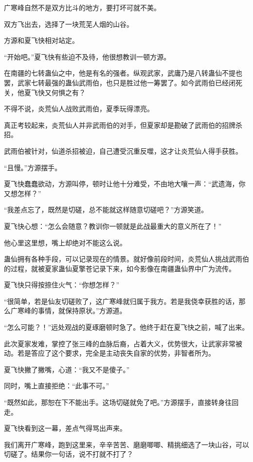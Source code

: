 \begin{this_body}
广寒峰自然不是双方比斗的地方，要打坏可就不美。

双方飞出去，选择了一块荒芜人烟的山谷。

方源和夏飞快相对站定。

“开始吧。”夏飞快有些迫不及待，他很想教训一顿方源。

在南疆的七转蛊仙之中，他是有名的强者。纵观武家，武庸乃是八转蛊仙不提也罢，武家七转最强的蛊仙武雨伯，也只是胜过他一筹罢了。如今武雨伯已经闭死关，他夏飞快又何惧之有？

不得不说，炎荒仙人战败武雨伯，夏季玩得漂亮。

真正考较起来，炎荒仙人并非武雨伯的对手，但夏家却是勘破了武雨伯的招牌杀招。

武雨伯被针对，仙道杀招被迫，自己遭受沉重反噬，这才让炎荒仙人得手获胜。

“且慢。”方源摆手。

夏飞快蠢蠢欲动，方源叫停，顿时让他十分难受，不由地大嚷一声：“武遗海，你又想怎样？”

“我差点忘了，既然是切磋，总不能就这样随意切磋吧？”方源笑道。

夏飞快心想：“怎么会随意？教训你一顿就是此战最重大的意义所在了！”

他心里这里想，嘴上却绝对不能这么说。

蛊仙拥有各种手段，可以记录现在的情景。就好像前段时间，炎荒仙人挑战武雨伯的过程，就被夏家蛊仙夏擎苍记录下来，如今影像在南疆蛊仙界中广为流传。

夏飞快只得按捺住火气：“你想怎样？”

“很简单，若是仙友切磋败了，这广寒峰就归属于我方。若是我侥幸获胜的话，那么广寒峰的事情，就保持原状。”方源道。

“怎么可能？！”远处观战的夏琢磨顿时急了。他终于赶在夏飞快之前，喊了出来。

此次夏家发难，掌控了张三峰的血脉后裔，占着大义，优势很大，让武家非常被动。若是答应了这个要求，完全是主动丧失自家的优势，非智者所为。

夏飞快撇了撇嘴，心道：“我又不是傻子。”

同时，嘴上直接拒绝：“此事不可。”

“既然如此，那恕在下不能出手。这场切磋就免了吧。”方源摆手，直接转身往回走。

夏飞快看到这一幕，差点气得骂出声来。

我们离开广寒峰，跑到这里来，辛辛苦苦、磨磨唧唧、精挑细选了一块山谷，可以切磋了。结果你一句话，说不打就不打了？


\end{this_body}
